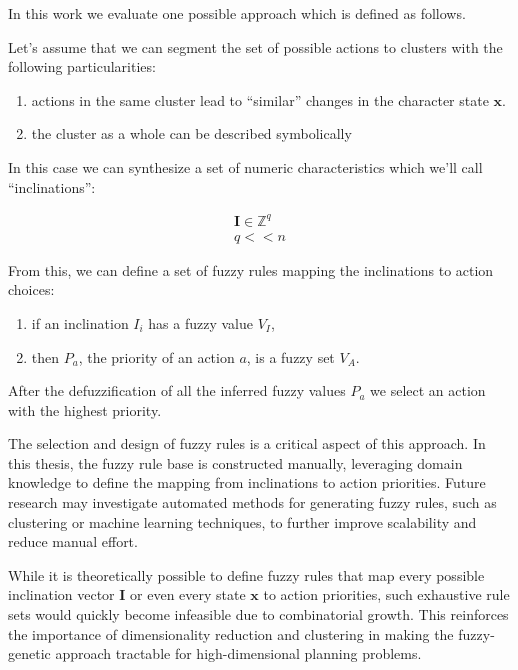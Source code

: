 \documentclass[11pt, a4paper]{article}
\begin{document}
	In this work we evaluate one possible approach which is defined as follows.
	
	Let's assume that we can segment the set of possible actions to clusters with the following particularities:
	
	\begin{enumerate}
		\item actions in the same cluster lead to ``similar'' changes in the character state $\mathbf{x}$.
		\item the cluster as a whole can be described symbolically
	\end{enumerate}
	
	In this case we can synthesize a set of numeric characteristics which we'll call ``inclinations'':
	
	\begin{eqnarray}
		\mathbf{I} \in \mathbb{Z}^q\\
		q << n \label{q<<n}
	\end{eqnarray}

	From this, we can define a set of fuzzy rules\cite{ray2014softcomputing} mapping the inclinations to action choices:

	\begin{enumerate}
		\item if an inclination $I_i$ has a fuzzy value $V_I$,
		\item then $P_a$, the priority of an action $a$, is a fuzzy set $V_A$.
	\end{enumerate}
	
	After the defuzzification of all the inferred fuzzy values $P_a$ we select an action with the highest priority.
	
	The selection and design of fuzzy rules is a critical aspect of this approach.
	In this thesis, the fuzzy rule base is constructed manually, leveraging domain knowledge to define the mapping from inclinations to action priorities.
	Future research may investigate automated methods for generating fuzzy rules, such as clustering or machine learning techniques, to further improve scalability and reduce manual effort.

	While it is theoretically possible to define fuzzy rules that map every possible inclination vector $\mathbf{I}$ or even every state $\mathbf{x}$ to action priorities, such exhaustive rule sets would quickly become infeasible due to combinatorial growth.
	This reinforces the importance of dimensionality reduction and clustering in making the fuzzy-genetic approach tractable for high-dimensional planning problems.
\end{document}
